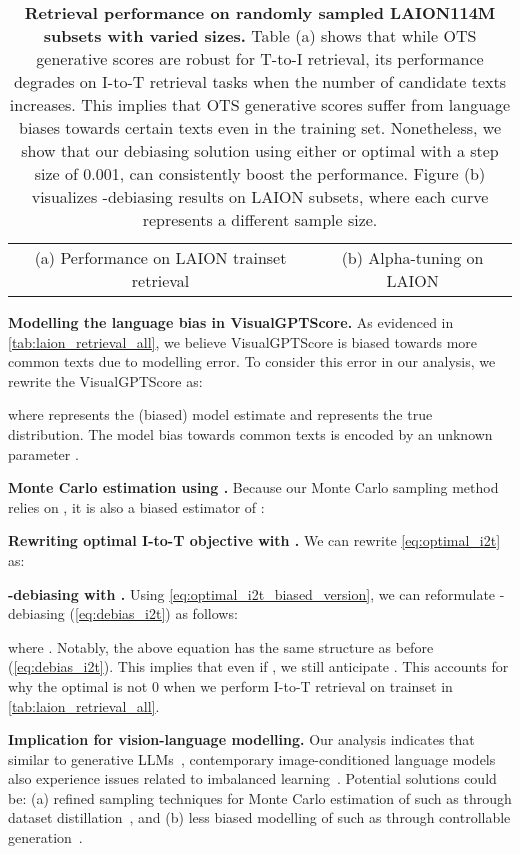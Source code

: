 \documentclass{article} \usepackage{iclr2024_conference,times}
\begin{document}
\begin{table}[h]
{\begin{tabular}[h]{cc}
        \multicolumn{1}{c}{{\large (a) Performance on LAION trainset retrieval}} & \multicolumn{1}{c}{{\large (b) Alpha-tuning on LAION}}
    \end{tabular}
    }
    \caption{\small {\bf Retrieval performance on randomly sampled LAION114M subsets with varied sizes.} Table (a) shows that while OTS generative scores are robust for T-to-I retrieval, its performance degrades on I-to-T retrieval tasks when the number of candidate texts increases. This implies that OTS generative scores suffer from language biases towards certain texts even in the training set. Nonetheless, we show that our debiasing solution using either  or optimal  with a step size of 0.001, can consistently boost the performance. Figure (b) visualizes -debiasing results on LAION subsets, where each curve represents a different sample size.}
    \label{tab:laion_retrieval_all}
\end{table}





{\bf Modelling the language bias in VisualGPTScore.} As evidenced in \autoref{tab:laion_retrieval_all}, we believe VisualGPTScore is biased towards more common texts due to modelling error. To consider this error in our analysis, we rewrite the VisualGPTScore as:

where  represents the (biased) model estimate and  represents the true distribution. The model bias towards common texts is encoded by an unknown parameter .


{\bf Monte Carlo estimation using .} Because our Monte Carlo sampling method relies on , it is also a biased estimator of :



{\bf Rewriting optimal I-to-T objective with .} We can rewrite \autoref{eq:optimal_i2t} as:



{\bf -debiasing with .} Using \autoref{eq:optimal_i2t_biased_version}, we can reformulate -debiasing (\autoref{eq:debias_i2t}) as follows:


where . Notably, the above equation has the same structure as before (\autoref{eq:debias_i2t}). This implies that even if , we still anticipate . This accounts for why the optimal  is not 0 when we perform I-to-T retrieval on trainset in \autoref{tab:laion_retrieval_all}. 


{\bf Implication for vision-language modelling.} Our analysis indicates that similar to generative LLMs~\citep{pmimt1, pmimt2}, contemporary image-conditioned language models also experience issues related to imbalanced learning~\citep{kang2019decoupling}. Potential solutions could be: (a) refined sampling techniques for Monte Carlo estimation of  such as through dataset distillation~\citep{wu2023multimodal}, and (b) less biased modelling of  such as through controllable generation~\citep{keskar2019ctrl}.
\end{document}
